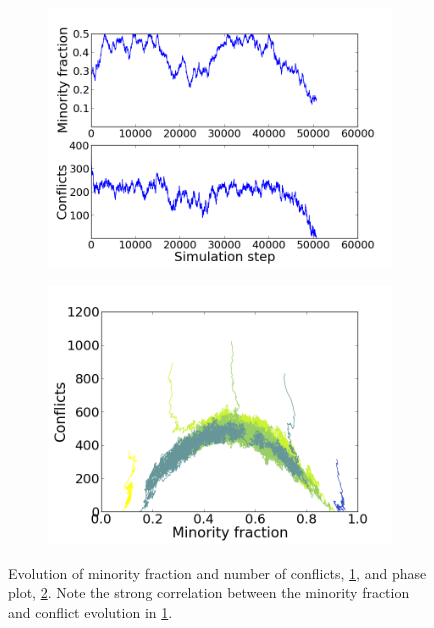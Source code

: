 \documentclass[11pt]{article}
\begin{document}
\begin{figure}[h!]
  \centering
  \begin{subfigure}{.5\textwidth}
    \centering
    \includegraphics[width=1.0\linewidth]{vmSlaving}
    \caption{}
    \label{fig:vmSlave}
  \end{subfigure}%
  \begin{subfigure}{.5\textwidth}
    \centering
    \includegraphics[width=1.0\linewidth]{vmPhasePlotv2}
    \caption{}
    \label{fig:vmPP}
  \end{subfigure}%
  \caption{Evolution of minority fraction and number of conflicts, \ref{fig:vmSlave}, and phase plot, \ref{fig:vmPP}. Note the strong correlation between the minority fraction and conflict evolution in \ref{fig:vmSlave}.}
  \label{fig:vmResults}
\end{figure}
\end{document}
